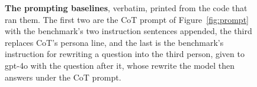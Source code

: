 \begin{figure}[t]
\centering
{}
\caption{\textbf{The prompting baselines}, verbatim, printed from the code
that ran them. The first two are the CoT prompt of Figure~\ref{fig:prompt}
with the benchmark's two instruction sentences appended, the third replaces
CoT's persona line, and the last is the benchmark's instruction for
rewriting a question into the third person, given to gpt-4o with the
question after it, whose rewrite the model then answers under the CoT
prompt.}
\label{fig-app-baseline-prompts}
\end{figure}

